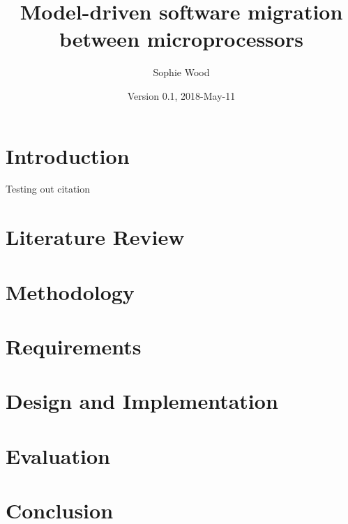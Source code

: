 \documentclass{UoYCSproject}
\author{Sophie Wood}
\title{Model-driven software migration between microprocessors}
\date{Version 0.1, 2018-May-11}
\begin{document}
\maketitle

\chapter{Introduction}
Testing out citation \parencite{modisco}

\chapter{Literature Review}

\chapter{Methodology}

\chapter{Requirements}

\chapter{Design and Implementation}

\chapter{Evaluation}

\chapter{Conclusion}

\printbibliography
\end{document}
